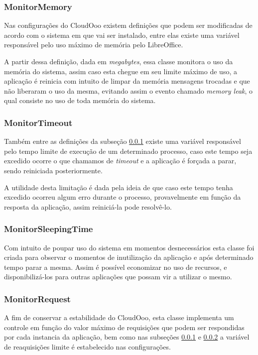 \subsubsection{MonitorMemory}
\label{monitormem}

Nas configurações do CloudOoo existem definições que podem ser modificadas de acordo com o sistema em que vai ser instalado, entre elas existe uma variável responsável pelo uso máximo de memória pelo LibreOffice.

A partir dessa definição, dada em \textit{megabytes}, essa classe monitora o uso da memória do sistema, assim caso esta chegue em seu limite máximo de uso, a aplicação é reinicia com intuito de limpar da memória mensagens trocadas e que não liberaram o uso da mesma, evitando assim o evento chamado \textit{memory leak}, o qual consiste no uso de toda memória do sistema.

\subsubsection{MonitorTimeout}
\label{monitortim}

Também entre as definições da subseção \ref{monitormem} existe uma variável responsável pelo tempo limite de execução de um determinado processo, caso este tempo seja excedido ocorre o que chamamos de \textit{timeout} e a aplicação é forçada a parar, sendo reiniciada posteriormente.

A utilidade desta limitação é dada pela ideia de que caso este tempo tenha excedido ocorreu algum erro durante o processo, provavelmente em função da resposta da aplicação, assim reiniciá-la pode resolvê-lo.

\subsubsection{MonitorSleepingTime}

Com intuito de poupar uso do sistema em momentos desnecessários esta classe foi criada para observar o momentos de inutilização da aplicação e após determinado tempo parar a mesma. Assim é possível economizar no uso de recursos, e disponibilizá-los para outras aplicações que possam vir a utilizar o mesmo.

\subsubsection{MonitorRequest}

A fim de conservar a estabilidade do CloudOoo, esta classe implementa um controle em função do valor máximo de requisições que podem ser respondidas por cada instancia da aplicação, bem como nas subseções \ref{monitormem} e \ref{monitortim} a variável de reaquisições limite é estabelecido nas configurações.

